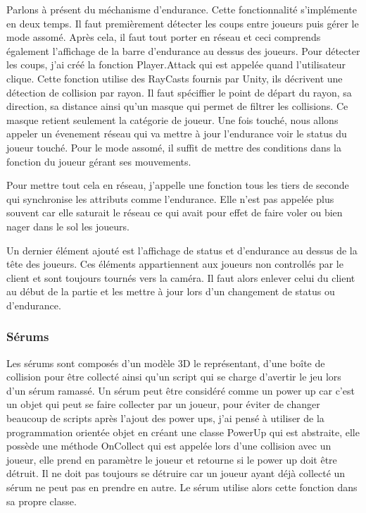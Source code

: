\documentclass{article}
\begin{document}
Parlons à présent du méchanisme d'endurance.
Cette fonctionnalité s'implémente en deux temps. Il faut premièrement détecter les coups entre joueurs puis gérer le mode assomé. Après cela, il faut tout porter en réseau et ceci comprends également l'affichage de la barre d'endurance au dessus des joueurs. Pour détecter les coups, j'ai créé la fonction Player.Attack qui est appelée quand l'utilisateur clique. Cette fonction utilise des RayCasts fournis par Unity, ils décrivent une détection de collision par rayon. Il faut spéciffier le point de départ du rayon, sa direction, sa distance ainsi qu'un masque qui permet de filtrer les collisions. Ce masque retient seulement la catégorie de joueur. Une fois touché, nous allons appeler un évenement réseau qui va mettre à jour l'endurance voir le status du joueur touché.
Pour le mode assomé, il suffit de mettre des conditions dans la fonction du joueur gérant ses mouvements.

Pour mettre tout cela en réseau, j'appelle une fonction tous les tiers de seconde qui synchronise les attributs comme l'endurance.
Elle n'est pas appelée plus souvent car elle saturait le réseau ce qui avait pour effet de faire voler ou bien nager dans le sol les joueurs.

Un dernier élément ajouté est l'affichage de status et d'endurance au dessus de la tête des joueurs. Ces éléments appartiennent aux joueurs non controllés par le client et sont toujours tournés vers la caméra. Il faut alors enlever celui du client au début de la partie et les mettre à jour lors d'un changement de status ou d'endurance.

\subsubsection{Sérums}

Les sérums sont composés d'un modèle 3D le représentant, d'une boîte de collision pour être collecté ainsi qu'un script qui se charge d'avertir le jeu lors d'un sérum ramassé.
Un sérum peut être considéré comme un power up car c'est un objet qui peut se faire collecter par un joueur, pour éviter de changer beaucoup de scripts après l'ajout des power ups, j'ai pensé à utiliser de la programmation orientée objet en créant une classe PowerUp qui est abstraite, elle possède une méthode OnCollect qui est appelée lors d'une collision avec un joueur, elle prend en paramètre le joueur et retourne si le power up doit être détruit. Il ne doit pas toujours se détruire car un joueur ayant déjà collecté un sérum ne peut pas en prendre en autre. Le sérum utilise alors cette fonction dans sa propre classe.
\end{document}
